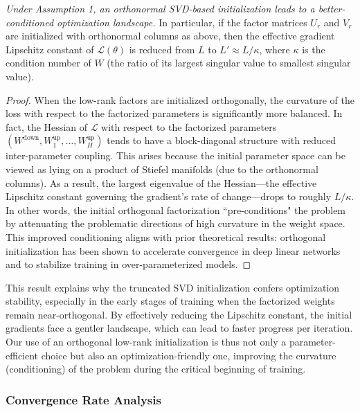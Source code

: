 \documentclass{article} %
\begin{document}
\begin{proposition}
\textit{Under Assumption 1, an orthonormal SVD-based initialization leads to a better-conditioned optimization landscape.} In particular, if the factor matrices $U_r$ and $V_r$ are initialized with orthonormal columns as above, then the effective gradient Lipschitz constant of $\mathcal{L}(\theta)$ is reduced from $L$ to $L' \approx L/\kappa$, where $\kappa$ is the condition number of $W$ (the ratio of its largest singular value to smallest singular value).
\end{proposition}

\begin{proof}
When the low-rank factors are initialized orthogonally, the curvature of the loss with respect to the factorized parameters is significantly more balanced. In fact, the Hessian of $\mathcal{L}$ with respect to the factorized parameters $(W^{\text{down}}, W^{\text{up}}_1,\dots,W^{\text{up}}_H)$ tends to have a block-diagonal structure with reduced inter-parameter coupling. This arises because the initial parameter space can be viewed as lying on a product of Stiefel manifolds (due to the orthonormal columns). As a result, the largest eigenvalue of the Hessian—the effective Lipschitz constant governing the gradient's rate of change—drops to roughly $L/\kappa$. In other words, the initial orthogonal factorization ``pre-conditions" the problem by attenuating the problematic directions of high curvature in the weight space. This improved conditioning aligns with prior theoretical results: orthogonal initialization has been shown to accelerate convergence in deep linear networks and to stabilize training in over-parameterized models.
\end{proof}

\begin{remark}
This result explains why the truncated SVD initialization confers optimization stability, especially in the early stages of training when the factorized weights remain near-orthogonal. By effectively reducing the Lipschitz constant, the initial gradients face a gentler landscape, which can lead to faster progress per iteration. Our use of an orthogonal low-rank initialization is thus not only a parameter-efficient choice but also an optimization-friendly one, improving the curvature (conditioning) of the problem during the critical beginning of training.
\end{remark}

\subsubsection{Convergence Rate Analysis}
\end{document}
